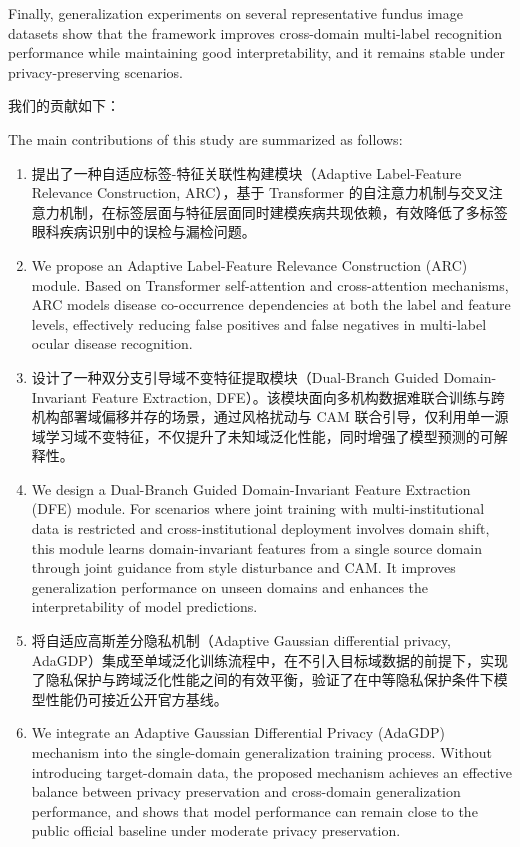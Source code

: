 Finally, generalization experiments on several representative fundus image datasets show that the framework improves cross-domain multi-label recognition performance while maintaining good interpretability, and it remains stable under privacy-preserving scenarios.

我们的贡献如下：

The main contributions of this study are summarized as follows:

\begin{enumerate}
\item 提出了一种自适应标签-特征关联性构建模块（Adaptive Label-Feature Relevance Construction, ARC），基于 Transformer 的自注意力机制与交叉注意力机制，在标签层面与特征层面同时建模疾病共现依赖，有效降低了多标签眼科疾病识别中的误检与漏检问题。

\item We propose an Adaptive Label-Feature Relevance Construction (ARC) module. Based on Transformer self-attention and cross-attention mechanisms, ARC models disease co-occurrence dependencies at both the label and feature levels, effectively reducing false positives and false negatives in multi-label ocular disease recognition.

\item 设计了一种双分支引导域不变特征提取模块（Dual-Branch Guided Domain-Invariant Feature Extraction, DFE）。该模块面向多机构数据难联合训练与跨机构部署域偏移并存的场景，通过风格扰动与 CAM 联合引导，仅利用单一源域学习域不变特征，不仅提升了未知域泛化性能，同时增强了模型预测的可解释性。

\item We design a Dual-Branch Guided Domain-Invariant Feature Extraction (DFE) module. For scenarios where joint training with multi-institutional data is restricted and cross-institutional deployment involves domain shift, this module learns domain-invariant features from a single source domain through joint guidance from style disturbance and CAM. It improves generalization performance on unseen domains and enhances the interpretability of model predictions.

\item 将自适应高斯差分隐私机制（Adaptive Gaussian differential privacy, AdaGDP）集成至单域泛化训练流程中，在不引入目标域数据的前提下，实现了隐私保护与跨域泛化性能之间的有效平衡，验证了在中等隐私保护条件下模型性能仍可接近公开官方基线。

\item We integrate an Adaptive Gaussian Differential Privacy (AdaGDP) mechanism into the single-domain generalization training process. Without introducing target-domain data, the proposed mechanism achieves an effective balance between privacy preservation and cross-domain generalization performance, and shows that model performance can remain close to the public official baseline under moderate privacy preservation.
\end{enumerate}

